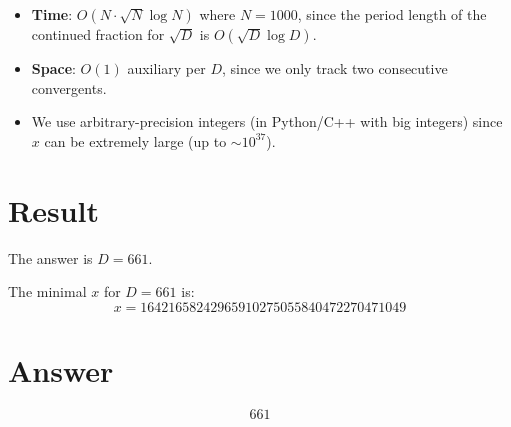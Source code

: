 \documentclass[12pt,a4paper]{article}
\begin{document}
\begin{itemize}
    \item \textbf{Time}: $O(N \cdot \sqrt{N} \log N)$ where $N = 1000$, since the period length of the continued fraction for $\sqrt{D}$ is $O(\sqrt{D} \log D)$.
    \item \textbf{Space}: $O(1)$ auxiliary per $D$, since we only track two consecutive convergents.
    \item We use arbitrary-precision integers (in Python/C++ with big integers) since $x$ can be extremely large (up to $\sim 10^{37}$).
\end{itemize}

\section{Result}

The answer is $\boxed{D = 661}$.

The minimal $x$ for $D = 661$ is:
\[
x = 16421658242965910275055840472270471049
\]

\section{Answer}

\[
\boxed{661}
\]
\end{document}
